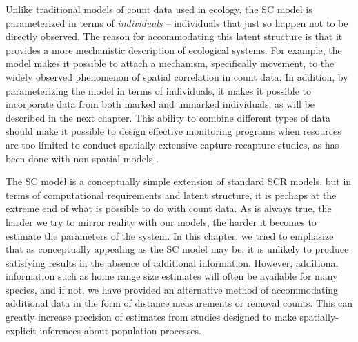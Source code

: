 Unlike traditional models of count data used in ecology, the SC model
is parameterized in terms of \textit{individuals} -- individuals that just so
happen not to be directly observed. The reason for accommodating this
latent structure is that it provides a more mechanistic description
of ecological systems. For example, the model makes it possible
to attach a
mechanism, specifically movement, to the widely observed phenomenon of spatial
correlation in count data. In addition, by parameterizing the model in
terms of individuals, it makes it possible to incorporate data from
both marked and unmarked individuals, as will be described in the next
chapter. This ability to combine different
types of data should make it possible to
design effective monitoring programs when resources are too limited to
conduct spatially extensive capture-recapture
studies, as has been done
with non-spatial models \citep{conroy_etal:2008}.

The SC model is a conceptually simple extension of standard SCR
models, but in terms of computational requirements and latent
structure, it is perhaps at the extreme end of what is possible to do
with count data. As is always true, the harder we try to mirror
reality with our models, the harder it becomes to estimate the
parameters of the system. In this chapter, we tried to emphasize that
as conceptually appealing as the SC model may be, it is unlikely to
produce satisfying results in the absence of additional
information. However, additional information such as home range size
estimates will often be available
for many species, and if not, we have provided an alternative method of
accommodating additional data in the form of distance measurements or
removal counts. This can greatly increase precision of estimates from studies
designed to make spatially-explicit inferences about population
processes.

